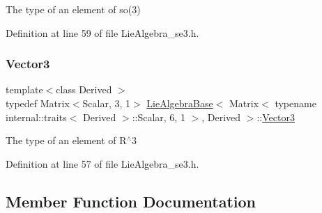 The type of an element of so(3) 

Definition at line 59 of file Lie\+Algebra\+\_\+se3.\+h.

\hypertarget{class_lie_algebra_base_3_01_matrix_3_01typename_01internal_1_1traits_3_01_derived_01_4_1_1_scala449314c781550590437697c4dc21a6d4_a18592115cf68b8c745a44d07305df4d2}{}\label{class_lie_algebra_base_3_01_matrix_3_01typename_01internal_1_1traits_3_01_derived_01_4_1_1_scala449314c781550590437697c4dc21a6d4_a18592115cf68b8c745a44d07305df4d2} 
\subsubsection{\texorpdfstring{Vector3}{Vector3}}
{\footnotesize\ttfamily template$<$class Derived $>$ \\
typedef Matrix$<$Scalar, 3, 1$>$ \hyperlink{class_lie_algebra_base}{Lie\+Algebra\+Base}$<$ Matrix$<$ typename internal\+::traits$<$ Derived $>$\+::Scalar, 6, 1 $>$, Derived $>$\+::\hyperlink{class_lie_algebra_base_3_01_matrix_3_01typename_01internal_1_1traits_3_01_derived_01_4_1_1_scala449314c781550590437697c4dc21a6d4_a18592115cf68b8c745a44d07305df4d2}{Vector3}}

The type of an element of R$^\wedge$3 

Definition at line 57 of file Lie\+Algebra\+\_\+se3.\+h.



\subsection{Member Function Documentation}
\hypertarget{class_lie_algebra_base_3_01_matrix_3_01typename_01internal_1_1traits_3_01_derived_01_4_1_1_scala449314c781550590437697c4dc21a6d4_a2ffbd92d09b85564bb06712ca119260c}{}\label{class_lie_algebra_base_3_01_matrix_3_01typename_01internal_1_1traits_3_01_derived_01_4_1_1_scala449314c781550590437697c4dc21a6d4_a2ffbd92d09b85564bb06712ca119260c} 

